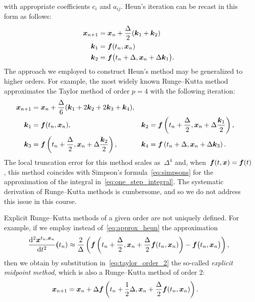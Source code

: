 with appropriate coefficients $c_i$ and $a_{ij}$.
Heun's iteration can be recast in this form as follows:
\begin{align*}
    \mathbf{\boldsymbol{x}}_{n+1} &= \mathbf{\boldsymbol{x}}_n + \frac{\Delta}{2}(\mathbf{\boldsymbol{k}}_1 + \mathbf{\boldsymbol{k}}_2) \\
    \mathbf{\boldsymbol{k}}_1 &= \mathbf{\boldsymbol{f}}(t_n, \mathbf{\boldsymbol{x}}_n)  \\
    \mathbf{\boldsymbol{k}}_2 &= \mathbf{\boldsymbol{f}} \bigl( t_{n} + \Delta, \mathbf{\boldsymbol{x}}_n + \Delta \mathbf{\boldsymbol{k}}_1 \bigr).
\end{align*}
The approach we employed to construct Heun's method may be generalized to higher orders.
For example, the most widely known Runge--Kutta method
approximates the Taylor method of order $p=4$ with the following iteration:
\begin{align*}
    \mathbf{\boldsymbol{x}}_{n+1} &= \mathbf{\boldsymbol{x}}_n + \frac{\Delta}{6}(\mathbf{\boldsymbol{k}}_1 + 2 \mathbf{\boldsymbol{k}}_2 + 2 \mathbf{\boldsymbol{k}}_3 + \mathbf{\boldsymbol{k}}_4), \\
     \mathbf{\boldsymbol{k}}_1 &= \mathbf{\boldsymbol{f}}(t_n, \mathbf{\boldsymbol{x}}_n), \qquad
               && \mathbf{\boldsymbol{k}}_2 = \mathbf{\boldsymbol{f}}\left(t_n + \frac{\Delta}{2}, \mathbf{\boldsymbol{x}}_n + \Delta\frac{\mathbf{\boldsymbol{k}}_1}{2}\right), \\
     \mathbf{\boldsymbol{k}}_3 &= \mathbf{\boldsymbol{f}}\left(t_n + \frac{\Delta}{2}, \mathbf{\boldsymbol{x}}_n + \Delta\frac{\mathbf{\boldsymbol{k}}_2}{2}\right), \qquad
               && \mathbf{\boldsymbol{k}}_4 = \mathbf{\boldsymbol{f}}\left(t_n + \Delta, \mathbf{\boldsymbol{x}}_n + \Delta \mathbf{\boldsymbol{k}}_3\right).
\end{align*}
The local truncation error for this method scales as~$\Delta^4$ and,
when~$\mathbf{\boldsymbol{f}}(t, \mathbf{\boldsymbol{x}}) = \mathbf{\boldsymbol{f}}(t)$,
this method coincides with Simpson's formula~\eqref{eq:simpsons} for the approximation of the integral in~\eqref{eq:one_step_integral}.
The systematic derivation of Runge--Kutta methods is cumbersome,
and so we do not address this issue in this course.

\begin{remark}
    Explicit Runge--Kutta methods of a given order are not uniquely defined.
    For example, if we employ instead of~\eqref{eq:approx_heun} the approximation
    \[
        \frac{\mathrm d^2 \mathbf{\boldsymbol{x}}^{t_n, \mathbf{\boldsymbol{x}}_n}}{\mathrm d t^{2}} \mathbf{\boldsymbol{(}}t_n)
        \approx \frac{2}{\Delta} \left( \mathbf{\boldsymbol{f}} \left(t_n + \frac{\Delta}{2}, \mathbf{\boldsymbol{x}}_n + \frac{\Delta}{2} \mathbf{\boldsymbol{f}}(t_n, \mathbf{\boldsymbol{x}}_n) \right) - \mathbf{\boldsymbol{f}} \bigl( t_{n}, \mathbf{\boldsymbol{x}}_n \bigr) \right),
    \]
    then we obtain by substitution in~\eqref{eq:taylor_order_2} the so-called \emph{explicit midpoint method},
    which is also a Runge--Kutta method of order 2:
    \begin{align*}
        \mathbf{\boldsymbol{x}}_{n+1} &= \mathbf{\boldsymbol{x}}_n + \Delta \mathbf{\boldsymbol{f}} \left( t_{n} + \frac{1}{2}\Delta, \mathbf{\boldsymbol{x}}_n + \frac{\Delta}{2} \mathbf{\boldsymbol{f}}(t_n, \mathbf{\boldsymbol{x}}_n) \right).
    \end{align*}
\end{remark}

